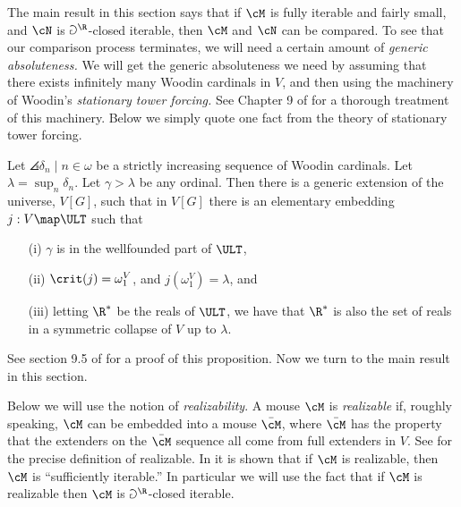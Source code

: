 The main result in this section says that if $\cM$ is fully iterable
and fairly small, and $\cN$ is $\Game^{\R}$-closed iterable, then $\cM$
and $\cN$ can be compared. To see that our comparison process terminates,
we will need a certain amount of \emph{generic absoluteness.}
We will get the generic absoluteness we need by assuming that there exists
infinitely many Woodin cardinals in $V$, and  then using the machinery of
Woodin's
\emph{stationary tower forcing.}
  See Chapter 9 of \cite{Martin_Book} for a thorough
treatment of this machinery. Below we simply quote one
fact from the theory
of stationary tower forcing.

\begin{proposition}[Woodin]
\label{firstprop}
Let $\angles{\delta_n \mid n\in\omega}$ be a strictly increasing sequence
of Woodin cardinals. Let $\lambda = \sup_{n} \delta_n$. Let
$\gamma > \lambda$ be any ordinal. Then there is a generic extension
of the universe, $V[G]$, such that in $V[G]$ there is an elementary
embedding $j:V\map \ULT$ such that
\begin{itemize}
\item[(i)] $\gamma$ is in the wellfounded part of $\ULT$,
\item[(ii)] $\crit(j)=\omega_1^V$, and $j(\omega_1^V)=\lambda$, and
\item[(iii)] letting $\R^*$ be the reals of $\ULT$, we have that $\R^*$
is also the set of reals in a symmetric collapse of $V$ up to $\lambda$.
\end{itemize}
\end{proposition}

See section 9.5 of \cite{Martin_Book} for a proof of this proposition.
Now we turn to the main result in this section.

\begin{remark}
Below we will use the notion of \emph{realizability}.
A mouse $\cM$ is \emph{realizable} if, roughly speaking, $\cM$ can be
embedded into a mouse $\bar{\cM}$, where $\bar{\cM}$ has the property
that the extenders on the $\bar{\cM}$ sequence all come from full
extenders in $V$. See \cite{Many_Woodins} for the precise definition
of realizable. In \cite{Many_Woodins} it is shown that if $\cM$ is
realizable, then $\cM$ is ``sufficiently iterable.'' In particular
we will use the fact that if $\cM$ is realizable then $\cM$ is
$\Game^{\R}$-closed iterable.
\end{remark}

